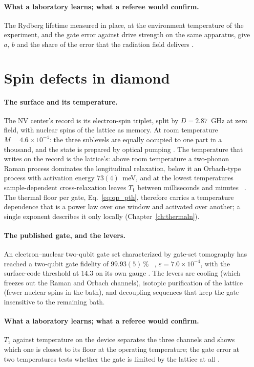 \paragraph{What a laboratory learns; what a referee would confirm.} The Rydberg lifetime measured in place, at the environment temperature
of the experiment, and the gate error against drive strength on the same apparatus, give $a$, $b$ and the share of the error that the
radiation field delivers \interp.

\section{Spin defects in diamond}\label{sec:qp_nv}
\paragraph{The surface and its temperature.} The NV center's record is its electron-spin triplet, split by $D=2.87$~GHz at zero field,
with nuclear spins of the lattice as memory. At room temperature $M=4.6\times10^{-4}$: the three sublevels are equally occupied to one part in
a thousand, and the state is prepared by optical pumping \calc. The temperature that writes on the record is the lattice's: above room
temperature a two-phonon Raman process dominates the longitudinal relaxation, below it an Orbach-type process with activation energy
$73(4)$~meV, and at the lowest temperatures sample-dependent cross-relaxation leaves $T_1$ between milliseconds and minutes~\cite{Jarmola2012}
\observed. The thermal floor per gate, Eq.~\eqref{eq:qp_pth}, therefore carries a temperature dependence that is a power law over one window
and activated over another; a single exponent describes it only locally (Chapter~\ref{ch:thermaln}).

\paragraph{The published gate, and the levers.} An electron--nuclear two-qubit gate set characterized by gate-set tomography has reached a
two-qubit gate fidelity of $99.93(5)$\,\%~\cite{Bartling2025} \observed, $\varepsilon=7.0\times10^{-4}$, with the surface-code threshold at 14.3
on its own gauge \calc. The levers are cooling (which freezes out the Raman and Orbach channels), isotopic purification of the lattice (fewer
nuclear spins in the bath), and decoupling sequences that keep the gate insensitive to the remaining bath.

\paragraph{What a laboratory learns; what a referee would confirm.} $T_1$ against temperature on the device separates the three channels and
shows which one is closest to its floor at the operating temperature; the gate error at two temperatures tests whether the gate is limited
by the lattice at all \interp.

